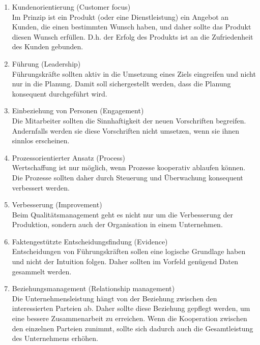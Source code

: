 \documentclass[11pt]{scrartcl}       %
\begin{document}
\begin{enumerate}
\item Kundenorientierung (Customer focus) 
\\
Im Prinzip ist ein Produkt (oder eine Dienstleistung) ein Angebot an Kunden, die einen bestimmten Wunsch haben, und daher sollte das Produkt diesen Wunsch erfüllen. D.h. der Erfolg des Produkts ist an die Zufriedenheit des Kunden gebunden.

\item Führung (Leadership) \\
Führungskräfte sollten aktiv in die Umsetzung eines Ziels eingreifen und nicht nur in die Planung. Damit soll sichergestellt werden, dass die Planung konsequent durchgeführt wird.

\item Einbeziehung von Personen (Engagement) \\
Die Mitarbeiter sollten die Sinnhaftigkeit der neuen Vorschriften begreifen. Andernfalls werden sie diese Vorschriften nicht umsetzen, wenn sie ihnen sinnlos erscheinen.

\item Prozessorientierter Ansatz (Process) \\
Wertschaffung ist nur möglich, wenn Prozesse kooperativ ablaufen können. Die Prozesse sollten daher durch Steuerung und Überwachung konsequent verbessert werden.

\item Verbesserung (Improvement) \\
Beim Qualitätsmanagement geht es nicht nur um die Verbesserung der Produktion, sondern auch der Organisation in einem Unternehmen.

\item Faktengestützte Entscheidungsfindung (Evidence) \\
Entscheidungen von Führungskräften sollen eine logische Grundlage haben und nicht der Intuition folgen. Daher sollten im Vorfeld genügend Daten gesammelt werden.

\item Beziehungsmanagement (Relationship management) \\
Die Unternehmensleistung hängt von der Beziehung zwischen den interessierten Parteien ab. Daher sollte diese Beziehung gepflegt werden, um eine bessere Zusammenarbeit zu erreichen. Wenn die Kooperation zwischen den einzelnen Parteien zunimmt, sollte sich dadurch auch die Gesamtleistung des Unternehmens erhöhen.
\end{enumerate}
\end{document}

